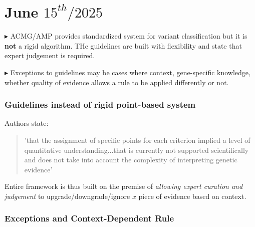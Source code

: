 \documentclass[../main.tex]{subfiles}
\begin{document}
\chapter{June $15^{th} / 2025$}
\label{ch:tufte-design}

$\blacktriangleright$ ACMG/AMP provides standardized system for variant classification but it is \textbf{not} a rigid algorithm. THe guidelines are built with flexibility and state that expert judgement is required.

\vspace{0.3cm}

$\blacktriangleright$ Exceptions to guidelines may be cases where context, gene-specific knowledge, whether quality of evidence allows a rule to be applied differently or not.

\vspace{0.3cm}

\subsection{Guidelines instead of rigid point-based system}

Authors state:
\begin{quote}
    'that the assignment of specific points for each criterion implied a level of quantitative understanding...that is currently not supported scientifically and does not take into account the complexity of interpreting genetic evidence'
\end{quote}   

Entire framework is thus built on the premise of \textit{allowing expert curation and judgement} to upgrade/downgrade/ignore $x$ piece of evidence based on context.

\subsection{Exceptions and Context-Dependent Rule \cite{Richards2015}} 
\end{document}
